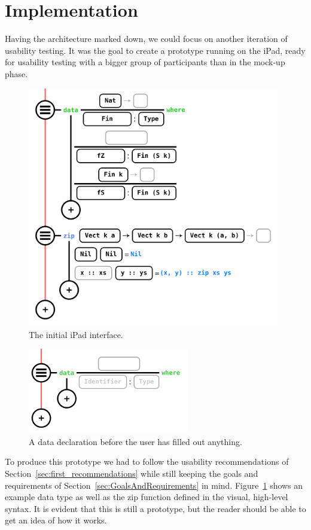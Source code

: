 \section{Implementation}
\label{sec:Implementation}

Having the architecture marked down, we could focus on another iteration of
usability testing. It was the goal to create a prototype running on the iPad,
ready for usability testing with a bigger group of participants than in the
mock-up phase.

\begin{figure}
	\centering
		\includegraphics[width=110mm]{diagrams/ipad_interface.PNG}
	\caption{The initial iPad interface.}
\label{fig:initialiPadInterface}
\end{figure}

\begin{figure}
	\centering
		\includegraphics[width=70mm]{diagrams/data_declaration.png}
	\caption{A data declaration before the user has filled out anything.}
\label{fig:data_declaration}
\end{figure}

To produce this prototype we had to follow the usability recommendations of
Section~\ref{sec:first_recommendations}	while still keeping the goals and requirements of
Section~\ref{sec:GoalsAndRequirements} in mind. Figure~\ref{fig:initialiPadInterface}
shows an example data type as well as the zip function defined in the visual,
high-level syntax. It is evident that this is still a prototype, but the reader
should be able to get an idea of how it works.

